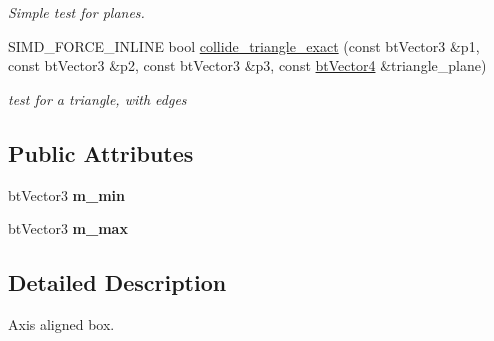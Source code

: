 \begin{DoxyCompactItemize}
\begin{DoxyCompactList}\small\item\em Simple test for planes. \end{DoxyCompactList}\item 
\hypertarget{class_g_i_m___a_a_b_b_a4a1ffa196d3981313fccf9e01aa383f9}{S\+I\+M\+D\+\_\+\+F\+O\+R\+C\+E\+\_\+\+I\+N\+L\+I\+N\+E bool \hyperlink{class_g_i_m___a_a_b_b_a4a1ffa196d3981313fccf9e01aa383f9}{collide\+\_\+triangle\+\_\+exact} (const bt\+Vector3 \&p1, const bt\+Vector3 \&p2, const bt\+Vector3 \&p3, const \hyperlink{classbt_vector4}{bt\+Vector4} \&triangle\+\_\+plane)}\label{class_g_i_m___a_a_b_b_a4a1ffa196d3981313fccf9e01aa383f9}

\begin{DoxyCompactList}\small\item\em test for a triangle, with edges \end{DoxyCompactList}\end{DoxyCompactItemize}
\subsection*{Public Attributes}
\begin{DoxyCompactItemize}
\item 
\hypertarget{class_g_i_m___a_a_b_b_ab98d3e8caddc76fcd6300d60150b63ce}{bt\+Vector3 {\bfseries m\+\_\+min}}\label{class_g_i_m___a_a_b_b_ab98d3e8caddc76fcd6300d60150b63ce}

\item 
\hypertarget{class_g_i_m___a_a_b_b_ab8008132c1b28e32f68f0b9e027e410c}{bt\+Vector3 {\bfseries m\+\_\+max}}\label{class_g_i_m___a_a_b_b_ab8008132c1b28e32f68f0b9e027e410c}

\end{DoxyCompactItemize}


\subsection{Detailed Description}
Axis aligned box. 

